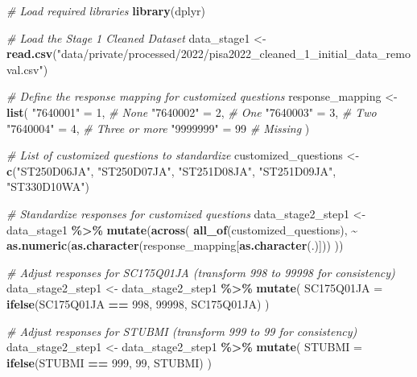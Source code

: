 \documentclass[
]{article}
\newenvironment{Shaded}{\begin{snugshade}}{\end{snugshade}}
\newcommand{\AttributeTok}[1]{\textcolor[rgb]{0.13,0.29,0.53}{#1}}
\newcommand{\CommentTok}[1]{\textcolor[rgb]{0.56,0.35,0.01}{\textit{#1}}}
\newcommand{\DecValTok}[1]{\textcolor[rgb]{0.00,0.00,0.81}{#1}}
\newcommand{\FunctionTok}[1]{\textcolor[rgb]{0.13,0.29,0.53}{\textbf{#1}}}
\newcommand{\NormalTok}[1]{#1}
\newcommand{\OtherTok}[1]{\textcolor[rgb]{0.56,0.35,0.01}{#1}}
\newcommand{\SpecialCharTok}[1]{\textcolor[rgb]{0.81,0.36,0.00}{\textbf{#1}}}
\newcommand{\StringTok}[1]{\textcolor[rgb]{0.31,0.60,0.02}{#1}}
\begin{document}
\begin{Shaded}
\begin{Highlighting}[]
\CommentTok{\# Load required libraries}
\FunctionTok{library}\NormalTok{(dplyr)}

\CommentTok{\# Load the Stage 1 Cleaned Dataset}
\NormalTok{data\_stage1 }\OtherTok{\textless{}{-}} \FunctionTok{read.csv}\NormalTok{(}\StringTok{"data/private/processed/2022/pisa2022\_cleaned\_1\_initial\_data\_removal.csv"}\NormalTok{)}

\CommentTok{\# Define the response mapping for customized questions}
\NormalTok{response\_mapping }\OtherTok{\textless{}{-}} \FunctionTok{list}\NormalTok{(}
  \StringTok{"7640001"} \OtherTok{=} \DecValTok{1}\NormalTok{,  }\CommentTok{\# None}
  \StringTok{"7640002"} \OtherTok{=} \DecValTok{2}\NormalTok{,  }\CommentTok{\# One}
  \StringTok{"7640003"} \OtherTok{=} \DecValTok{3}\NormalTok{,  }\CommentTok{\# Two}
  \StringTok{"7640004"} \OtherTok{=} \DecValTok{4}\NormalTok{,  }\CommentTok{\# Three or more}
  \StringTok{"9999999"} \OtherTok{=} \DecValTok{99}  \CommentTok{\# Missing}
\NormalTok{)}

\CommentTok{\# List of customized questions to standardize}
\NormalTok{customized\_questions }\OtherTok{\textless{}{-}} \FunctionTok{c}\NormalTok{(}\StringTok{"ST250D06JA"}\NormalTok{, }\StringTok{"ST250D07JA"}\NormalTok{, }\StringTok{"ST251D08JA"}\NormalTok{, }\StringTok{"ST251D09JA"}\NormalTok{, }\StringTok{"ST330D10WA"}\NormalTok{)}

\CommentTok{\# Standardize responses for customized questions}
\NormalTok{data\_stage2\_step1 }\OtherTok{\textless{}{-}}\NormalTok{ data\_stage1 }\SpecialCharTok{\%\textgreater{}\%}
  \FunctionTok{mutate}\NormalTok{(}\FunctionTok{across}\NormalTok{(}
    \FunctionTok{all\_of}\NormalTok{(customized\_questions),}
    \SpecialCharTok{\textasciitilde{}} \FunctionTok{as.numeric}\NormalTok{(}\FunctionTok{as.character}\NormalTok{(response\_mapping[}\FunctionTok{as.character}\NormalTok{(.)]))}
\NormalTok{  ))}

\CommentTok{\# Adjust responses for SC175Q01JA (transform 998 to 99998 for consistency)}
\NormalTok{data\_stage2\_step1 }\OtherTok{\textless{}{-}}\NormalTok{ data\_stage2\_step1 }\SpecialCharTok{\%\textgreater{}\%}
  \FunctionTok{mutate}\NormalTok{(}
    \AttributeTok{SC175Q01JA =} \FunctionTok{ifelse}\NormalTok{(SC175Q01JA }\SpecialCharTok{==} \DecValTok{998}\NormalTok{, }\DecValTok{99998}\NormalTok{, SC175Q01JA)}
\NormalTok{  )}

\CommentTok{\# Adjust responses for STUBMI (transform 999 to 99 for consistency)}
\NormalTok{data\_stage2\_step1 }\OtherTok{\textless{}{-}}\NormalTok{ data\_stage2\_step1 }\SpecialCharTok{\%\textgreater{}\%}
  \FunctionTok{mutate}\NormalTok{(}
    \AttributeTok{STUBMI =} \FunctionTok{ifelse}\NormalTok{(STUBMI }\SpecialCharTok{==} \DecValTok{999}\NormalTok{, }\DecValTok{99}\NormalTok{, STUBMI)}
\NormalTok{  )}


\end{Highlighting}
\end{Shaded}
\end{document}
